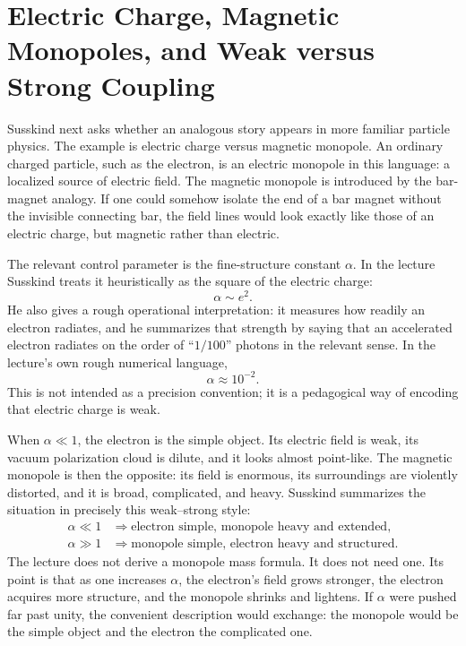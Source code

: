 \section{Electric Charge, Magnetic Monopoles, and Weak versus Strong Coupling}

Susskind next asks whether an analogous story appears in more familiar particle physics. The example is electric charge versus magnetic monopole. An ordinary charged particle, such as the electron, is an electric monopole in this language: a localized source of electric field. The magnetic monopole is introduced by the bar-magnet analogy. If one could somehow isolate the end of a bar magnet without the invisible connecting bar, the field lines would look exactly like those of an electric charge, but magnetic rather than electric.

The relevant control parameter is the fine-structure constant \(\alpha\). In the lecture Susskind treats it heuristically as the square of the electric charge:
\begin{equation}
\alpha \sim e^2.
\end{equation}
He also gives a rough operational interpretation: it measures how readily an electron radiates, and he summarizes that strength by saying that an accelerated electron radiates on the order of ``\(1/100\)'' photons in the relevant sense. In the lecture's own rough numerical language,
\begin{equation}
\alpha \approx 10^{-2}.
\end{equation}
This is not intended as a precision convention; it is a pedagogical way of encoding that electric charge is weak.

When \(\alpha\ll 1\), the electron is the simple object. Its electric field is weak, its vacuum polarization cloud is dilute, and it looks almost point-like. The magnetic monopole is then the opposite: its field is enormous, its surroundings are violently distorted, and it is broad, complicated, and heavy. Susskind summarizes the situation in precisely this weak--strong style:
\begin{align}
\alpha \ll 1
&\Rightarrow
\text{electron simple, monopole heavy and extended},\\
\alpha \gg 1
&\Rightarrow
\text{monopole simple, electron heavy and structured}.
\end{align}
The lecture does not derive a monopole mass formula. It does not need one. Its point is that as one increases \(\alpha\), the electron's field grows stronger, the electron acquires more structure, and the monopole shrinks and lightens. If \(\alpha\) were pushed far past unity, the convenient description would exchange: the monopole would be the simple object and the electron the complicated one.

